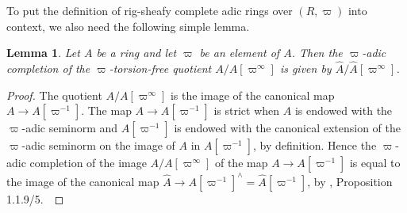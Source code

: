 \documentclass[12pt,twoside,a4paper]{article}
\newtheorem{lemma}[thm]{Lemma}
\theoremstyle{definition}
\theoremstyle{remark}
\begin{document}
To put the definition of rig-sheafy complete adic rings over $(R, \varpi)$ into context, we also need the following simple lemma.
\begin{lemma}\label{Completions are torsion-free}Let $A$ be a ring and let $\varpi$ be an element of $A$. Then the $\varpi$-adic completion of the $\varpi$-torsion-free quotient $A/A[\varpi^{\infty}]$ is given by $\widehat{A}/\widehat{A}[\varpi^{\infty}]$.\end{lemma}
\begin{proof}The quotient $A/A[\varpi^{\infty}]$ is the image of the canonical map $A\to A[\varpi^{-1}]$. The map $A\to A[\varpi^{-1}]$ is strict when $A$ is endowed with the $\varpi$-adic seminorm and $A[\varpi^{-1}]$ is endowed with the canonical extension of the $\varpi$-adic seminorm on the image of $A$ in $A[\varpi^{-1}]$, by definition. Hence the $\varpi$-adic completion of the image $A/A[\varpi^{\infty}]$ of the map $A\to A[\varpi^{-1}]$ is equal to the image of the canonical map $\widehat{A}\to A[\varpi^{-1}]^{\wedge}=\widehat{A}[\varpi^{-1}]$, by \cite{BGR}, Proposition 1.1.9/5. \end{proof}      
\end{document}
